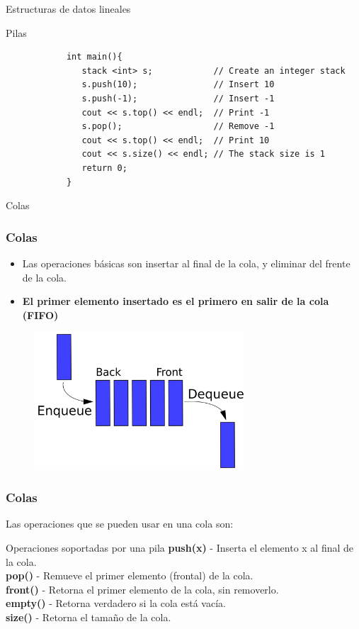 \documentclass{beamer}
\begin{document}
\begin{section}{Estructuras de datos lineales}
\begin{subsection}{Pilas}
\begin{frame}[fragile]
\begin{lstlisting}
			int main(){
			   stack <int> s;            // Create an integer stack
			   s.push(10);               // Insert 10
			   s.push(-1);               // Insert -1
			   cout << s.top() << endl;  // Print -1
			   s.pop();                  // Remove -1
			   cout << s.top() << endl;  // Print 10
			   cout << s.size() << endl; // The stack size is 1
			   return 0;
			}
		\end{lstlisting}
	\end{frame}

\end{subsection}

\begin{subsection}{Colas}
	\begin{frame}[fragile]
		\frametitle{Colas}
		\begin{itemize}
			\item {Las operaciones básicas son insertar al final de la cola, y eliminar del frente de la cola.}
			\item {\textbf{El primer elemento insertado es el primero en salir de la cola (FIFO)}}
		\end{itemize}
		\begin{figure}
			\includegraphics[width = 0.7\textwidth]{src/cola.jpg}
		\end{figure}
	\end{frame}

	\begin{frame}[fragile]
		\frametitle{Colas}
		Las operaciones que se pueden usar en una cola son:
		\begin{block}{Operaciones soportadas por una pila}
			\textbf{push(x)} - Inserta el elemento x al final de la cola.\\
			\textbf{pop()} - Remueve el primer elemento (frontal) de la cola.\\
			\textbf{front()} - Retorna el primer elemento de la cola, sin removerlo.\\
			\textbf{empty()} - Retorna verdadero si la cola está vacía.\\
			\textbf{size()} - Retorna el tamaño de la cola.			
		\end{block}		
	\end{frame}
	

\end{subsection}
\end{section}
\end{document}
